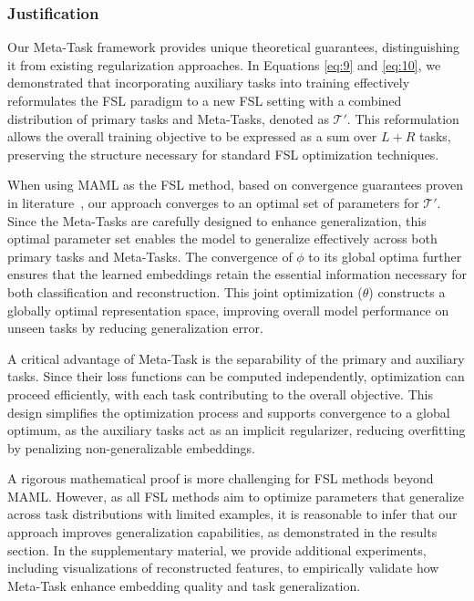 \subsubsection{Justification}

Our Meta-Task framework provides unique theoretical guarantees, distinguishing it from existing regularization approaches. In Equations \eqref{eq:9} and \eqref{eq:10}, we demonstrated that incorporating auxiliary tasks into training effectively reformulates the FSL paradigm to a new FSL setting with a combined distribution of primary tasks and Meta-Tasks, denoted as 
$\mathcal{T}'$. This reformulation allows the overall training objective to be expressed as a sum over $L+R$ tasks, preserving the structure necessary for standard FSL optimization techniques.

When using MAML as the FSL method, based on convergence guarantees proven in literature~\cite{wang2022global}, our approach converges to an optimal set of parameters for $\mathcal{T}'$. Since the Meta-Tasks are carefully designed to enhance generalization, this optimal parameter set enables the model to generalize effectively across both primary tasks and Meta-Tasks. The convergence of $\phi$ to its global optima further ensures that the learned embeddings retain the essential information necessary for both classification and reconstruction. This joint optimization ($\theta$) constructs a globally optimal representation space, improving overall model performance on unseen tasks by reducing generalization error.

A critical advantage of Meta-Task is the separability of the primary and auxiliary tasks. Since their loss functions can be computed independently, optimization can proceed efficiently, with each task contributing to the overall objective. This design simplifies the optimization process and supports convergence to a global optimum, as the auxiliary tasks act as an implicit regularizer, reducing overfitting by penalizing non-generalizable embeddings.

A rigorous mathematical proof is more challenging for FSL methods beyond MAML. However, as all FSL methods aim to optimize parameters that generalize across task distributions with limited examples, it is reasonable to infer that our approach improves generalization capabilities, as demonstrated in the results section. In the supplementary material, we provide additional experiments, including visualizations of reconstructed features, to empirically validate how Meta-Task enhance embedding quality and task generalization.

